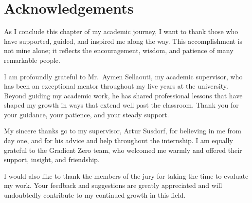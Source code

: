 \chapter*{Acknowledgements}

{\large
As I conclude this chapter of my academic journey, I want to thank those who have supported, guided, and inspired me along the way. This accomplishment is not mine alone; it reflects the encouragement, wisdom, and patience of many remarkable people.

\bigskip
I am profoundly grateful to Mr.\ Aymen Sellaouti, my academic supervisor, who has been an exceptional mentor throughout my five years at the university. Beyond guiding my academic work, he has shared professional lessons that have shaped my growth in ways that extend well past the classroom. Thank you for your guidance, your patience, and your steady support.

\bigskip
My sincere thanks go to my supervisor, Artur Susdorf, for believing in me from day one, and for his advice and help throughout the internship. I am equally grateful to the Gradient Zero team, who welcomed me warmly and offered their support, insight, and friendship.

\bigskip
I would also like to thank the members of the jury for taking the time to evaluate my work. Your feedback and suggestions are greatly appreciated and will undoubtedly contribute to my continued growth in this field.
}
